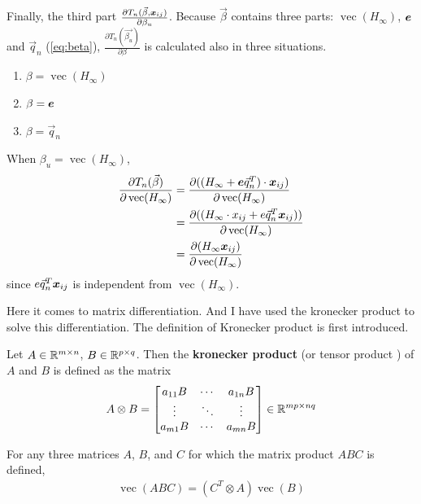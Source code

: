 Finally, the third part $\frac{\partial T_n(\vec{\beta}, \boldsymbol{x}_{ij})}{\partial \beta_u}$. Because $\vec{\beta}$ contains three parts: $\operatorname {vec}(H_\infty)$, $\boldsymbol{e}$ and $\vec{q}_n$ (\cref{eq:beta}),  $\frac{\partial T_n(\vec{\beta_u})}{\partial \beta}$ is calculated also in three situations. 
\begin{enumerate}
	\item $\beta =  \operatorname {vec}(H_\infty)$ 
	\item $\beta = \boldsymbol{e}$ 
	\item $\beta = \vec{q}_n$ 
\end{enumerate}

When $\beta_u =  \operatorname {vec}(H_\infty)$, 
\begin{align}\label{eq:H_infty}
\frac{\partial T_n(\vec{\beta})}{\partial \operatorname {vec}(H_\infty)} & = \frac{\partial ((H_{\infty} + \boldsymbol{e} \vec{q}_{n}^T) \cdot \boldsymbol{x}_{ij})} {\partial \operatorname {vec}(H_\infty)} \nonumber \\
	& = \frac{\partial ((H_{\infty} \cdot x_{ij} + e \vec{q}_{n}^T \boldsymbol{x}_{ij}) )}{\partial \operatorname {vec}(H_\infty)}  \nonumber \\
	& = \frac{\partial (H_{\infty} \boldsymbol{x}_{ij})} {\partial \operatorname {vec}(H_\infty)}
\end{align}
since $e \vec{q}_{n}^T \boldsymbol{x}_{ij}$ is independent from $\operatorname {vec}(H_\infty)$. 

Here it comes to matrix differentiation. And I have used the kronecker product to solve this differentiation. The definition of Kronecker product is first introduced.
\begin{definition}\label{def:Kronecker product}
	Let $A \in \mathbb{R}^{m \times n}$, $B \in \mathbb{R}^{p \times q}$. Then the \textbf{kronecker product} (or tensor product ) of $A$ and $B$ is defined as the matrix
	\begin{align}
		A \otimes B = \begin{bmatrix}
			a_{11} {B} & \cdots & a_{1n}{B} \\
			\vdots & \ddots &           \vdots \\
			a_{m1} {B} & \cdots & a_{mn} {B}
		\end{bmatrix} \in \mathbb{R}^{mp \times nq}
	\end{align}
\end{definition}
\begin{theorem}\label{def:Matrix equation}
	For any three matrices $A$, $B$, and $C$ for which the matrix product $ABC$ is defined,
	\begin{align} \label{eq:kronecker product}
		\operatorname {vec}(ABC) = (C^T \otimes A)\operatorname {vec}(B)
	\end{align}
\end{theorem}

